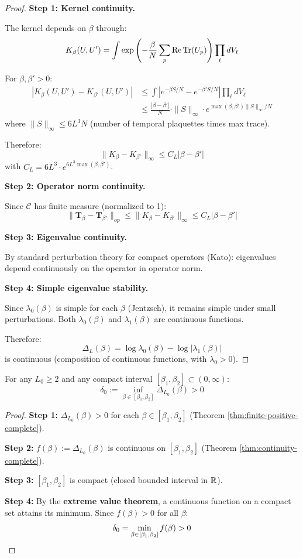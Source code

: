 \begin{proof}
\textbf{Step 1: Kernel continuity.}

The kernel depends on $\beta$ through:
\[
K_\beta(U, U') = \int \exp\left(-\frac{\beta}{N} \sum_p \operatorname{Re}\operatorname{Tr}(U_p)\right) \prod_\ell dV_\ell
\]

For $\beta, \beta' > 0$:
\begin{align*}
|K_\beta(U, U') - K_{\beta'}(U, U')| &\leq \int \left|e^{-\beta S/N} - e^{-\beta' S/N}\right| \prod_\ell dV_\ell \\
&\leq \frac{|\beta - \beta'|}{N} \cdot \|S\|_\infty \cdot e^{\max(\beta, \beta') \|S\|_\infty/N}
\end{align*}
where $\|S\|_\infty \leq 6L^3 N$ (number of temporal plaquettes times max trace).

Therefore:
\[
\|K_\beta - K_{\beta'}\|_\infty \leq C_L |\beta - \beta'|
\]
with $C_L = 6L^3 \cdot e^{6L^3 \max(\beta, \beta')}$.

\textbf{Step 2: Operator norm continuity.}

Since $\mathcal{C}$ has finite measure (normalized to 1):
\[
\|\mathbf{T}_\beta - \mathbf{T}_{\beta'}\|_{op} \leq \|K_\beta - K_{\beta'}\|_\infty \leq C_L |\beta - \beta'|
\]

\textbf{Step 3: Eigenvalue continuity.}

By standard perturbation theory for compact operators (Kato):
eigenvalues depend continuously on the operator in operator norm.

\textbf{Step 4: Simple eigenvalue stability.}

Since $\lambda_0(\beta)$ is simple for each $\beta$ (Jentzsch), it remains simple 
under small perturbations. Both $\lambda_0(\beta)$ and $\lambda_1(\beta)$ are 
continuous functions.

Therefore:
\[
\Delta_L(\beta) = \log\lambda_0(\beta) - \log|\lambda_1(\beta)|
\]
is continuous (composition of continuous functions, with $\lambda_0 > 0$).
\end{proof}

\begin{theorem}
\label{thm:uniform-lower-complete}
For any $L_0 \geq 2$ and any compact interval $[\beta_1, \beta_2] \subset (0, \infty)$:
\[
\delta_0 := \inf_{\beta \in [\beta_1, \beta_2]} \Delta_{L_0}(\beta) > 0
\]
\end{theorem}

\begin{proof}
\textbf{Step 1:} $\Delta_{L_0}(\beta) > 0$ for each $\beta \in [\beta_1, \beta_2]$ 
(Theorem \ref{thm:finite-positive-complete}).

\textbf{Step 2:} $f(\beta) := \Delta_{L_0}(\beta)$ is continuous on $[\beta_1, \beta_2]$ 
(Theorem \ref{thm:continuity-complete}).

\textbf{Step 3:} $[\beta_1, \beta_2]$ is compact (closed bounded interval in $\mathbb{R}$).

\textbf{Step 4:} By the \textbf{extreme value theorem}, a continuous function on a 
compact set attains its minimum. Since $f(\beta) > 0$ for all $\beta$:
\[
\delta_0 = \min_{\beta \in [\beta_1, \beta_2]} f(\beta) > 0 \qedhere
\]
\end{proof}

